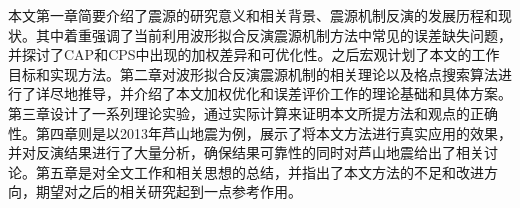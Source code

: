 \begin{cnabstract}
本文第一章简要介绍了震源的研究意义和相关背景、震源机制反演的发展历程和现状。其中着重强调了当前利用波形拟合反演震源机制方法中常见的误差缺失问题，并探讨了CAP和CPS中出现的加权差异和可优化性。之后宏观计划了本文的工作目标和实现方法。第二章对波形拟合反演震源机制的相关理论以及格点搜索算法进行了详尽地推导，并介绍了本文加权优化和误差评价工作的理论基础和具体方案。第三章设计了一系列理论实验，通过实际计算来证明本文所提方法和观点的正确性。第四章则是以2013年芦山地震为例，展示了将本文方法进行真实应用的效果，并对反演结果进行了大量分析，确保结果可靠性的同时对芦山地震给出了相关讨论。第五章是对全文工作和相关思想的总结，并指出了本文方法的不足和改进方向，期望对之后的相关研究起到一点参考作用。

\end{cnabstract}
\vspace{1em}\par\vfill





